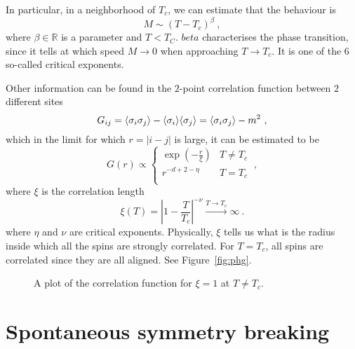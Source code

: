     In particular, in a neighborhood of $T_c$, we can estimate that the behaviour is
    \begin{equation}\label{ph:beta}
        M \sim (T - T_c)^\beta ~,
    \end{equation}
    where $\beta \in \mathbb R$ is a parameter and $T < T_C$. $beta$ characterises the phase transition, since it tells at which speed $M \rightarrow 0$ when approaching $T \rightarrow T_c$. It is one of the $6$ so-called critical exponents.

    Other information can be found in the $2$-point correlation function between $2$ different sites
    \begin{equation*}
        G_{ij} = \langle\sigma_i \sigma_j\rangle - \langle\sigma_i\rangle \langle\sigma_j\rangle =  \langle\sigma_i \sigma_j\rangle - m^2 ~,
    \end{equation*}
    which in the limit for which $r = |i - j|$ is large, it can be estimated to be 
    \begin{equation}\label{ph:eta}
        G(r) \propto \begin{cases}
            \exp(- \frac{r}{\xi}) & T \neq T_c \\
            r^{-d+2-\eta} & T = T_c \\
        \end{cases} ~,
    \end{equation}
    where $\xi$ is the correlation length 
    \begin{equation}\label{ph:nu}
        \xi(T) = |1 - \frac{T}{T_c}|^{-\nu} \xrightarrow{T \rightarrow T_c} \infty ~.
    \end{equation}
    where $\eta$ and $\nu$ are critical exponents. Physically, $\xi$ tells us what is the radius inside which all the spins are strongly correlated. For $ T = T_c$, all spins are correlated since they are all aligned. See Figure~\eqref{fig:phg}.

    \begin{figure}[h!]
        \centering
        \caption{A plot of the correlation function for $\xi = 1$ at $T \neq T_c$.}
        \label{fig:phg}
    \end{figure}

\section{Spontaneous symmetry breaking}

